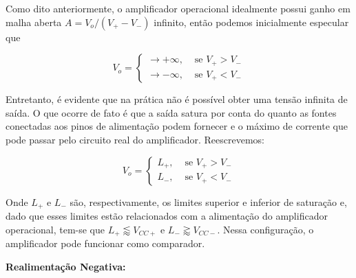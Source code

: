 \documentclass{article}
\numberwithin{equation}{section}
\newcommand{\curtovirtual}{($(opamp.+)+(0.3,0)$) to[open,v^=$ $, l=0, voltage shift=1] ($(opamp.-)+(0.3,0)$)}
\begin{document}
Como dito anteriormente, o amplificador operacional idealmente possui ganho em malha aberta $A= V_o/(V_+-V_-)$ infinito, então podemos inicialmente especular que

    \begin{center}
        \[V_o =
        \begin{cases}

            \rightarrow +\infty,& \text{ se }  V_+>V_-\\ 

             \rightarrow -\infty,& \text{ se }  V_+<V_-

        \end{cases}
        \]
    \end{center}
    
Entretanto, é evidente que na prática não é possível obter uma tensão infinita de saída. O que ocorre de fato é que a saída satura por conta do quanto as fontes conectadas aos pinos de alimentação podem fornecer e o máximo de corrente que pode passar pelo circuito real do amplificador. Reescrevemos:

    \begin{center}
        \[V_o =
        \begin{cases}

            L_+,& \text{ se }  V_+>V_-\\ 

            L_-,& \text{ se }  V_+<V_-

        \end{cases}
        \]
    \end{center}

Onde $L_+$ e $L_-$ são, respectivamente, os limites superior e inferior de saturação e, dado que esses limites estão relacionados com a alimentação do amplificador operacional, tem-se que $L_+\lessapprox V_{CC+}$ e $L_-\gtrapprox V_{CC-}$. Nessa configuração, o amplificador pode funcionar como comparador.


\vspace{5mm}
\noindent\textbf{Realimentação Negativa:}

\begin{center}
\end{center}
\end{document}
